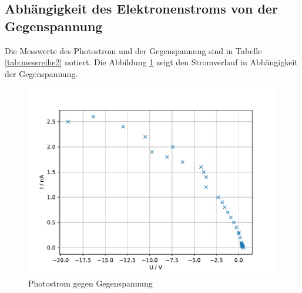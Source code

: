 \subsection{Abhängigkeit des Elektronenstroms von der Gegenspannung}
Die Messwerte des Photostrom und der Gegenspannung sind in Tabelle \ref{tab:messreihe2} notiert.
Die Abbildung \ref{fig:Messreihe2} zeigt den Stromverlauf in Abhängigkeit der Gegenspannung.

\begin{figure}[h!]
  \centering
  \includegraphics[width=\textwidth]{messreihe2.pdf}
  \caption{Photostrom gegen Gegenspannung}
  \label{fig:Messreihe2}
\end{figure}
\FloatBarrier
